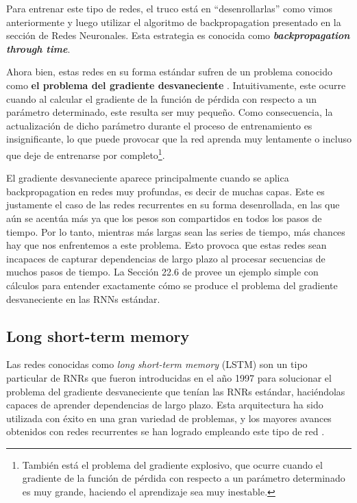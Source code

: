 \documentclass[../../main.tex]{subfiles}
\begin{document}
Para entrenar este tipo de redes, el truco está en ``desenrollarlas'' como vimos
anteriormente y luego utilizar el algoritmo de backpropagation presentado en la sección de
Redes Neuronales. Esta estrategia es conocida como \textbf{\textit{backpropagation through
time}}.

Ahora bien, estas redes en su forma estándar sufren de un problema conocido como
\textbf{el problema del gradiente desvaneciente} \cite{vanishing-gradient}.
Intuitivamente, este ocurre cuando al calcular el gradiente de la función de pérdida con
respecto a un parámetro determinado, este resulta ser muy pequeño. Como consecuencia, la
actualización de dicho parámetro durante el proceso de entrenamiento es insignificante, lo
que puede provocar que la red aprenda muy lentamente o incluso que deje de entrenarse por
completo\footnote{También está el problema del gradiente explosivo, que ocurre cuando el
gradiente de la función de pérdida con respecto a un parámetro determinado es muy grande,
haciendo el aprendizaje sea muy inestable.}.

El gradiente desvaneciente aparece principalmente cuando se aplica backpropagation en
redes muy profundas, es decir de muchas capas. Este es justamente el caso de las redes
recurrentes en su forma desenrollada, en las que aún se acentúa más ya que los pesos son
compartidos en todos los pasos de tiempo. Por lo tanto, mientras más largas sean las
series de tiempo, más chances hay que nos enfrentemos a este problema. Esto provoca que
estas redes sean incapaces de capturar dependencias de largo plazo al procesar secuencias
de muchos pasos de tiempo. La Sección 22.6 de \cite{ai-a-modern-approach} provee un
ejemplo simple con cálculos para entender exactamente cómo se produce el problema
del gradiente desvaneciente en las RNNs estándar.

\subsection{Long short-term memory}
Las redes conocidas como \textit{long short-term memory} (LSTM) son un tipo particular de
RNRs que fueron introducidas en el año 1997 \cite{lstm-paper-1997} para solucionar el
problema del gradiente desvaneciente que tenían las RNRs estándar, haciéndolas capaces
de aprender dependencias de largo plazo. Esta arquitectura ha sido utilizada con éxito en
una gran variedad de problemas, y los mayores avances obtenidos con redes recurrentes se
han logrado empleando este tipo de red \cite{colahs-blog-lstm-2015}.
\end{document}
